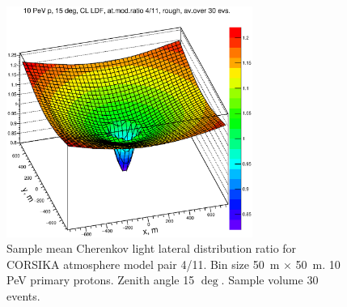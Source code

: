 \documentclass[final,5p,times,twocolumn]{elsarticle}
\begin{document}
\begin{figure}[tb]
\centering
\includegraphics[width=19pc]{figs/4d11.eps}%
\vspace{-1.0pc}
\caption{Sample mean Cherenkov light lateral distribution ratio for CORSIKA atmosphere model
pair 4/11. Bin size 50~m $\times$ 50~m. 10 PeV primary protons. Zenith angle 15 $\deg$. Sample volume 30 events.}
\label{fig:4d11}
\end{figure}
\end{document}
